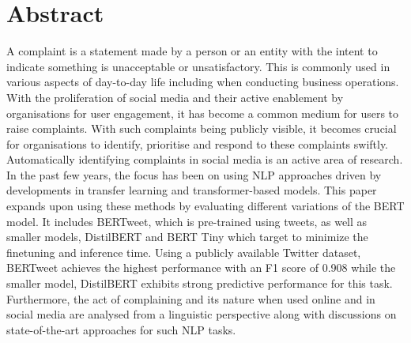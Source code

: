 \chapter*{\Large \center Abstract}

A complaint is a statement made by a person or an entity with the intent to indicate something is unacceptable or unsatisfactory. This is commonly used in various aspects of day-to-day life including when conducting business operations. With the proliferation of social media and their active enablement by organisations for user engagement, it has become a common medium for users to raise complaints. With such complaints being publicly visible, it becomes crucial for organisations to identify, prioritise and respond to these complaints swiftly. Automatically identifying complaints in social media is an active area of research. In the past few years, the focus has been on using NLP approaches driven by developments in transfer learning and transformer-based models.
\newline \newline
This paper expands upon using these methods by evaluating different variations of the BERT model. It includes BERTweet, which is pre-trained using tweets, as well as smaller models, DistilBERT and BERT Tiny which target to minimize the finetuning and inference time. Using a publicly available Twitter dataset, BERTweet achieves the highest performance with an F1 score of 0.908 while the smaller model, DistilBERT exhibits strong predictive performance for this task. Furthermore, the act of complaining and its nature when used online and in social media are analysed from a linguistic perspective along with discussions on state-of-the-art approaches for such NLP tasks.
